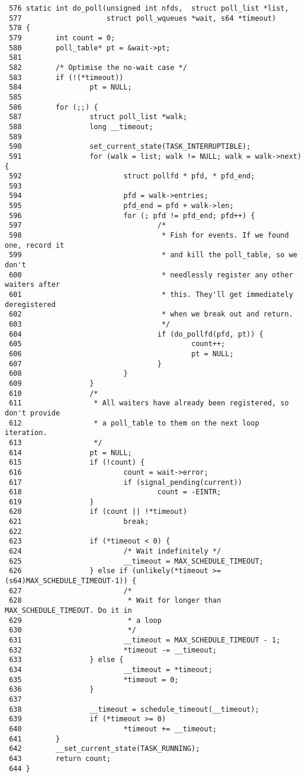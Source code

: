 \documentclass{article}
\begin{document}
\begin{verbatim}
 576 static int do_poll(unsigned int nfds,  struct poll_list *list,
 577                    struct poll_wqueues *wait, s64 *timeout)
 578 {
 579        int count = 0;
 580        poll_table* pt = &wait->pt;
 581
 582        /* Optimise the no-wait case */
 583        if (!(*timeout))
 584                pt = NULL;
 585
 586        for (;;) {
 587                struct poll_list *walk;
 588                long __timeout;
 589
 590                set_current_state(TASK_INTERRUPTIBLE);
 591                for (walk = list; walk != NULL; walk = walk->next) {
 592                        struct pollfd * pfd, * pfd_end;
 593
 594                        pfd = walk->entries;
 595                        pfd_end = pfd + walk->len;
 596                        for (; pfd != pfd_end; pfd++) {
 597                                /*
 598                                 * Fish for events. If we found one, record it
 599                                 * and kill the poll_table, so we don't
 600                                 * needlessly register any other waiters after
 601                                 * this. They'll get immediately deregistered
 602                                 * when we break out and return.
 603                                 */
 604                                if (do_pollfd(pfd, pt)) {
 605                                        count++;
 606                                        pt = NULL;
 607                                }
 608                        }
 609                }
 610                /*
 611                 * All waiters have already been registered, so don't provide
 612                 * a poll_table to them on the next loop iteration.
 613                 */
 614                pt = NULL;
 615                if (!count) {
 616                        count = wait->error;
 617                        if (signal_pending(current))
 618                                count = -EINTR;
 619                }
 620                if (count || !*timeout)
 621                        break;
 622
 623                if (*timeout < 0) {
 624                        /* Wait indefinitely */
 625                        __timeout = MAX_SCHEDULE_TIMEOUT;
 626                } else if (unlikely(*timeout >= (s64)MAX_SCHEDULE_TIMEOUT-1)) {
 627                        /*
 628                         * Wait for longer than MAX_SCHEDULE_TIMEOUT. Do it in
 629                         * a loop
 630                         */
 631                        __timeout = MAX_SCHEDULE_TIMEOUT - 1;
 632                        *timeout -= __timeout;
 633                } else {
 634                        __timeout = *timeout;
 635                        *timeout = 0;
 636                }
 637
 638                __timeout = schedule_timeout(__timeout);
 639                if (*timeout >= 0)
 640                        *timeout += __timeout;
 641        }
 642        __set_current_state(TASK_RUNNING);
 643        return count;
 644 }
\end{verbatim}
\end{document}
